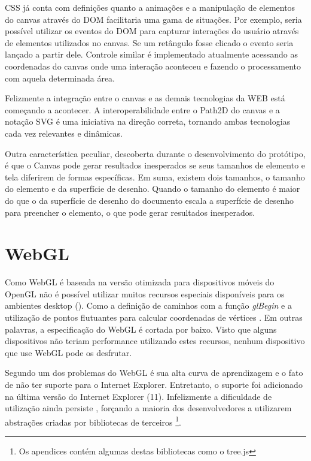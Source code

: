 CSS já conta com definições quanto a animações e a manipulação de
elementos do canvas através do DOM facilitaria uma gama de situações.
Por exemplo, seria possível utilizar os eventos do DOM para capturar
interações do usuário através de elementos utilizados no canvas.
Se um retângulo fosse clicado o evento seria lançado a partir dele.
Controle similar é implementado atualmente acessando as coordenadas
do canvas onde uma interação aconteceu e fazendo o processamento com
aquela determinada área.

Felizmente a integração entre o canvas e as demais tecnologias da
WEB está começando a acontecer. A interoperabilidade entre o Path2D
do canvas e a notação SVG é uma iniciativa na direção correta,
tornando ambas tecnologias cada vez relevantes e dinâmicas.

Outra característica peculiar, descoberta durante o desenvolvimento
do protótipo, é que o Canvas pode gerar resultados inesperados se
seus tamanhos de elemento e tela diferirem de formas específicas. Em
suma, existem dois tamanhos, o tamanho do elemento e da superfície de
desenho. Quando o tamanho do elemento é maior do que o da superfície
de desenho do documento escala a superfície de desenho para preencher o
elemento, o que pode gerar resultados inesperados.

\section{WebGL}

Como WebGL é baseada na versão otimizada para dispositivos móveis do
OpenGL não é possível utilizar muitos recursos especiais disponíveis
para os ambientes desktop ().
Como a definição de caminhos com a função \textit{glBegin} e a
utilização de pontos flutuantes para calcular coordenadas de vértices
\autocite{esVsGl}. Em outras palavras, a especificação do WebGL é
cortada por baixo. Visto que alguns dispositivos não teriam performance
utilizando estes recursos, nenhum dispositivo que use WebGL pode os
desfrutar.

Segundo \citet{html5mostwanted} um dos problemas do WebGL é sua alta
curva de aprendizagem e o fato de não ter suporte para o Internet
Explorer. Entretanto, o suporte foi adicionado na última versão do
Internet Explorer (11). Infelizmente a dificuldade de utilização
ainda persiste , forçando a maioria dos desenvolvedores a utilizarem
abstrações criadas por bibliotecas de terceiros \footnote{Os apendices
contém algumas destas bibliotecas como o tree.js}.

